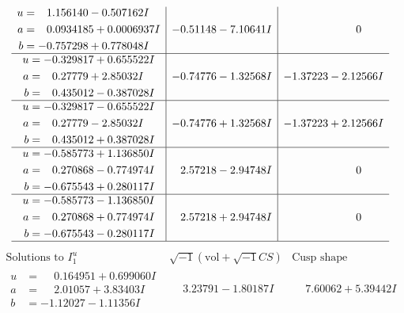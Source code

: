 \documentclass[1p]{elsarticle_modified}
\theoremstyle{definition}
\newcommand{\I}{\sqrt{-1}}
\begin{document}
$$\begin{array}{c|c|c}
\begin{aligned}
u &= \phantom{-}1.156140 - 0.507162 I \\
a &= \phantom{-}0.0934185 + 0.0006937 I \\
b &= -0.757298 + 0.778048 I\end{aligned}
 & -0.51148 - 7.10641 I & \phantom{-0.000000 } 0 \\ \hline\begin{aligned}
u &= -0.329817 + 0.655522 I \\
a &= \phantom{-}0.27779 + 2.85032 I \\
b &= \phantom{-}0.435012 - 0.387028 I\end{aligned}
 & -0.74776 - 1.32568 I & -1.37223 - 2.12566 I \\ \hline\begin{aligned}
u &= -0.329817 - 0.655522 I \\
a &= \phantom{-}0.27779 - 2.85032 I \\
b &= \phantom{-}0.435012 + 0.387028 I\end{aligned}
 & -0.74776 + 1.32568 I & -1.37223 + 2.12566 I \\ \hline\begin{aligned}
u &= -0.585773 + 1.136850 I \\
a &= \phantom{-}0.270868 - 0.774974 I \\
b &= -0.675543 + 0.280117 I\end{aligned}
 & \phantom{-}2.57218 - 2.94748 I & \phantom{-0.000000 } 0 \\ \hline\begin{aligned}
u &= -0.585773 - 1.136850 I \\
a &= \phantom{-}0.270868 + 0.774974 I \\
b &= -0.675543 - 0.280117 I\end{aligned}
 & \phantom{-}2.57218 + 2.94748 I & \phantom{-0.000000 } 0\\
 \hline 
 \end{array}$$\newpage$$\begin{array}{c|c|c}  
\text{Solutions to }I^u_{1}& \I (\text{vol} + \sqrt{-1}CS) & \text{Cusp shape}\\
 \hline 
\begin{aligned}
u &= \phantom{-}0.164951 + 0.699060 I \\
a &= \phantom{-}2.01057 + 3.83403 I \\
b &= -1.12027 - 1.11356 I\end{aligned}
 & \phantom{-}3.23791 - 1.80187 I & \phantom{-}7.60062 + 5.39442 I \\ \hline\begin{aligned}

\end{aligned}
\end{array}$$
\end{document}
